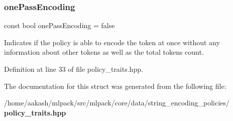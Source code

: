 \subsubsection{one\+Pass\+Encoding}
{\footnotesize\ttfamily const bool one\+Pass\+Encoding = false\hspace{0.3cm}{\ttfamily [static]}}



Indicates if the policy is able to encode the token at once without any information about other tokens as well as the total tokens count. 



Definition at line 33 of file policy\+\_\+traits.\+hpp.



The documentation for this struct was generated from the following file\+:\begin{DoxyCompactItemize}
\item 
/home/aakash/mlpack/src/mlpack/core/data/string\+\_\+encoding\+\_\+policies/\textbf{ policy\+\_\+traits.\+hpp}\end{DoxyCompactItemize}
